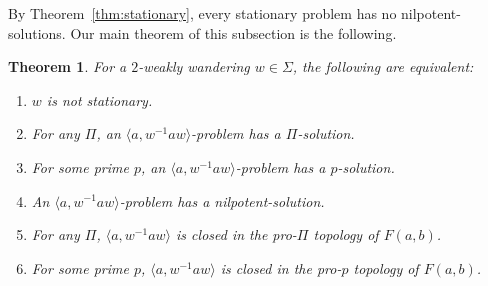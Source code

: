 \documentclass[11pt]{amsart}
\newtheorem{theorem}{Theorem}[section]
\theoremstyle{definition}
\theoremstyle{definition}
\numberwithin{equation}{section}
\begin{document}
By Theorem~\ref{thm:stationary}, every stationary problem has no nilpotent-solutions. Our main theorem of this subsection is the following.

\begin{theorem}\label{thm:2ww} For a  $2$-weakly wandering $w\in\Sigma$, the following are equivalent:
\begin{enumerate}
\item[(i)] $w$ is not stationary.
\item[(ii)] For any $\Pi$, an $\langle a, w^{-1}aw\rangle$-problem has a $\Pi$-solution.
\item[(iii)] For some prime $p$, an $\langle a, w^{-1}aw\rangle$-problem has a $p$-solution.
\item[(iv)] An $\langle a, w^{-1}aw\rangle$-problem has a nilpotent-solution.
\item[(v)] For any $\Pi$, $\langle a, w^{-1}aw\rangle$ is closed in the pro-$\Pi$ topology of $F(a, b)$.
\item[(vi)] For some prime $p$, $\langle a, w^{-1}aw\rangle$ is closed in the pro-$p$ topology of $F(a, b)$.
\end{enumerate}
\end{theorem}
\end{document}
